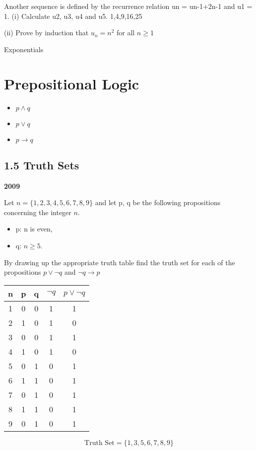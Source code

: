 \documentclass[]{report}
\begin{document}
Another sequence is defined by the recurrence relation un = un-1+2n-1 and
u1 = 1.
(i) Calculate u2, u3, u4 and u5.
1,4,9,16,25

(ii) Prove by induction that $u_n = n^2$ for all $n \geq 1$

Exponentials
\newpage

\section*{Prepositional Logic}


\begin{itemize}
	\item $p \wedge q$
	\item $p \vee q$
	\item $p \rightarrow q$
\end{itemize}
\newpage
\subsection*{1.5 Truth Sets}
\textbf{2009} 

Let $n = \{1, 2,3,4, 5,6,7, 8, 9\}$ and let p, q be the following propositions concerning the integer $n$.
\begin{itemize}
\item p: n is even, 
\item q: $n\geq 5$.
\end{itemize}
By drawing up the appropriate truth table ﬁnd the truth set for each of the
propositions $p \vee \neg q$ and $ \neg q \rightarrow p$

\begin{tabular}{|c|c|c|c|c|}
\hline n & p & q & $\neg q$ & $p \vee \neg q$ \\ 
\hline 1 & 0 & 0 & 1 & 1\\ 
\hline 2 & 1 & 0 & 1 & 0\\ 
\hline 3 & 0 & 0 & 1 & 1\\ 
\hline 4 & 1 & 0 & 1 & 0\\ 
\hline 5 & 0 & 1 & 0 & 1\\ 
\hline 6 & 1 & 1 & 0 & 1\\ 
\hline 7 & 0 & 1 & 0 & 1\\ 
\hline 8 & 1 & 1 & 0 & 1\\ 
\hline 9 & 0 & 1 & 0 & 1\\ 
\hline 
\end{tabular} 
\[\mbox{Truth Set} = \{1,3,5,6,7,8,9\}\]
\end{document}
